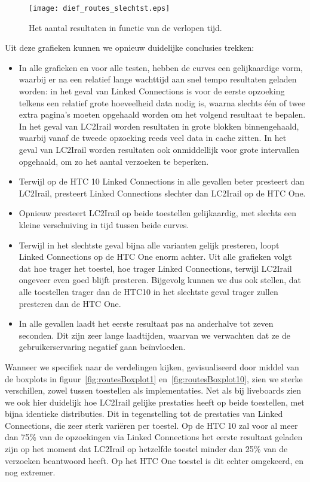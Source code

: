 \begin{figure}[h]
	\centering
	\texttt{[image: dief\_routes\_slechtst.eps]}
	\caption[Aantal resultaten routes in functie van de tijd (90e percentiel)]{Het aantal resultaten in functie van de verlopen tijd.}
	\label{fig:routesDiefSlechtst}
\end{figure}

Uit deze grafieken kunnen we opnieuw duidelijke conclusies trekken:
\begin{itemize}
	\item In alle grafieken en voor alle testen, hebben de curves een gelijkaardige vorm, waarbij er na een relatief lange wachttijd aan snel tempo resultaten geladen worden: in het geval van Linked Connections is voor de eerste opzoeking telkens een relatief grote hoeveelheid data nodig is, waarna slechts één of twee extra pagina's moeten opgehaald worden om het volgend resultaat te bepalen. In het geval van LC2Irail worden resultaten in grote blokken binnengehaald, waarbij vanaf de tweede opzoeking reeds veel data in cache zitten. In het geval van LC2Irail worden resultaten ook onmiddellijk voor grote intervallen opgehaald, om zo het aantal verzoeken te beperken. 
	\item Terwijl op de HTC 10 Linked Connections in alle gevallen beter presteert dan LC2Irail, presteert Linked Connections slechter dan LC2Irail op de HTC One. 
	\item Opnieuw presteert LC2Irail op beide toestellen gelijkaardig, met slechts een kleine verschuiving in tijd tussen beide curves.
	\item Terwijl in het slechtste geval bijna alle varianten gelijk presteren, loopt Linked Connections op de HTC One enorm achter. Uit alle grafieken volgt dat hoe trager het toestel, hoe trager Linked Connections, terwijl LC2Irail ongeveer even goed blijft presteren. Bijgevolg kunnen we dus ook stellen, dat alle toestellen trager dan de HTC10 in het slechtste geval trager zullen presteren dan de HTC One.
	\item In alle gevallen laadt het eerste resultaat pas na anderhalve tot zeven seconden. Dit zijn zeer lange laadtijden, waarvan we verwachten dat ze de gebruikerservaring negatief gaan beïnvloeden.
\end{itemize}

Wanneer we specifiek naar de verdelingen kijken, gevisualiseerd door middel van de boxplots in figuur~\ref{fig:routesBoxplot1} en~\ref{fig:routesBoxplot10}, zien we sterke verschillen, zowel tussen toestellen als implementaties. Net als bij liveboards zien we ook hier duidelijk hoe LC2Irail gelijke prestaties heeft op beide toestellen, met bijna identieke distributies. Dit in tegenstelling tot de prestaties van Linked Connections, die zeer sterk variëren per toestel. Op de HTC 10 zal voor al meer dan 75\% van de opzoekingen via Linked Connections het eerste resultaat geladen zijn op het moment dat LC2Irail op hetzelfde toestel minder dan 25\% van de verzoeken beantwoord heeft. Op het HTC One toestel is dit echter omgekeerd, en nog extremer. 

